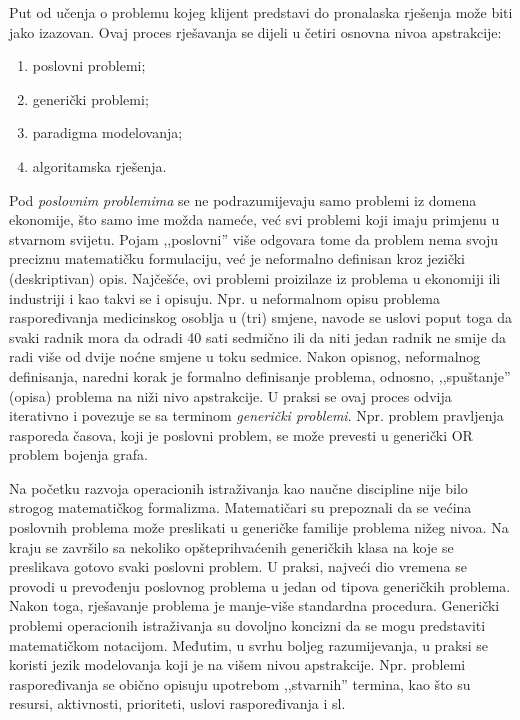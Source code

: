 \documentclass[b5paper, utf8, 11pt, colorlinks]{book}
\theoremstyle{definition}
\begin{document}
  Put od učenja o problemu kojeg klijent predstavi do pronalaska rješenja može biti jako izazovan. Ovaj proces rješavanja se  dijeli u četiri osnovna nivoa apstrakcije:
  \begin{enumerate}
      \item poslovni problemi;
      \item generički problemi; 
      \item paradigma modelovanja;
      \item algoritamska rješenja. 
  \end{enumerate}
  
 Pod \emph{poslovnim problemima}  se ne podrazumijevaju samo problemi iz domena ekonomije, što samo ime možda nameće, već svi problemi koji imaju primjenu u stvarnom svijetu. Pojam ,,poslovni'' više odgovara tome da problem nema svoju preciznu matematičku formulaciju, već je neformalno definisan kroz jezički (deskriptivan) opis.  Najčešće, ovi problemi proizilaze iz problema u ekonomiji ili industriji i kao takvi se i opisuju. Npr. u neformalnom opisu problema raspoređivanja medicinskog osoblja u (tri) smjene, navode se uslovi poput toga da svaki radnik mora da odradi 40 sati sedmično ili da niti jedan radnik ne smije da radi više od dvije noćne smjene u toku sedmice. Nakon opisnog, neformalnog definisanja, naredni korak 
 je formalno definisanje problema, odnosno, ,,spuštanje'' (opisa) problema na niži nivo apstrakcije. U praksi se ovaj proces odvija iterativno i povezuje se sa terminom \emph{generički problemi}. Npr. problem pravljenja rasporeda časova, koji je poslovni problem, se može prevesti u generički OR problem bojenja grafa.

Na početku razvoja operacionih istraživanja kao naučne discipline nije bilo strogog matematičkog formalizma. Matematičari su prepoznali da se većina poslovnih problema može  preslikati u generičke familije problema nižeg nivoa. Na kraju se završilo sa nekoliko opšteprihvaćenih generičkih klasa na koje se preslikava gotovo svaki poslovni problem. U praksi, najveći dio vremena se provodi u prevođenju poslovnog problema u jedan od tipova generičkih problema. Nakon toga, rješavanje problema je manje-više standardna procedura. Generički problemi operacionih istraživanja su dovoljno koncizni da se mogu predstaviti  matematičkom notacijom. Međutim, u svrhu boljeg razumijevanja, u praksi se koristi jezik modelovanja koji je na višem nivou apstrakcije. Npr. problemi raspoređivanja se obično opisuju upotrebom ,,stvarnih'' termina, kao što su resursi, aktivnosti, prioriteti, uslovi raspoređivanja i sl.  
\end{document}
